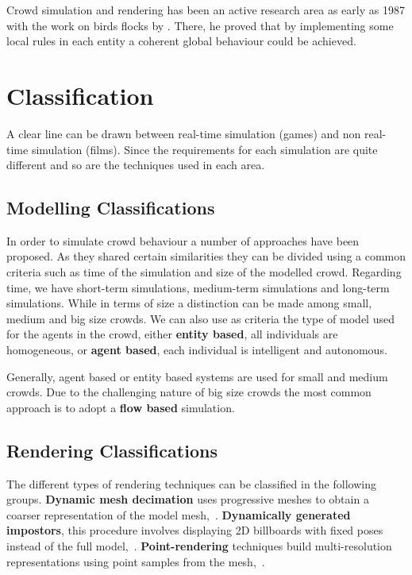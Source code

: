 \documentclass[11pt,twocolumn]{article}
\numberwithin{equation}{section} %
\numberwithin{figure}{section} %
\numberwithin{table}{section} %
\begin{document}
Crowd simulation and rendering has been an active research area as early as 1987 with the work on birds flocks by \cite{Reynolds1987}.
There, he proved that by implementing some local rules in each entity a coherent global behaviour could be achieved.

\section{Classification}

A clear line can be drawn between real-time simulation (games) and non real-time simulation (films).
Since the requirements for each simulation are quite different and so are the techniques used in each area.

\subsection{Modelling Classifications}

In order to simulate crowd behaviour a number of approaches have been proposed.
As they shared certain similarities they can be divided using a common criteria such as time of the simulation and size of the modelled crowd.
Regarding time, we have short-term simulations, medium-term simulations and long-term simulations.
While in terms of size a distinction can be made among small, medium and big size crowds.
We can also use as criteria the type of model used for the agents in the crowd, either \textbf{entity based}, all individuals are homogeneous, or \textbf{agent based}, each individual is intelligent and autonomous.

Generally, agent based or entity based systems are used for small and medium crowds.
Due to the challenging nature of big size crowds the most common approach is to adopt a \textbf{flow based} simulation.

\subsection{Rendering Classifications}

The different types of rendering techniques can be classified in the following groups.
\textbf{Dynamic mesh decimation} uses progressive meshes to obtain a coarser representation of the model mesh,~\cite{Hoppe1996}.
\textbf{Dynamically generated impostors}, this procedure involves displaying 2D billboards with fixed poses instead of the full model,~\cite{Aubel2000}.
\textbf{Point-rendering} techniques build multi-resolution representations using point samples from the mesh,~\cite{Wand2002}.
\end{document}
